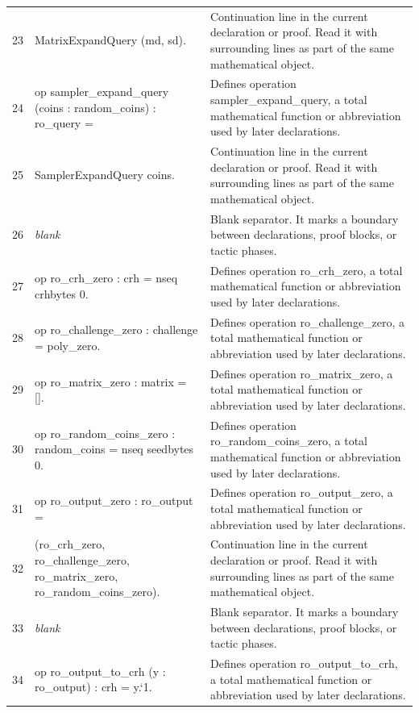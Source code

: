 \documentclass[10pt]{article}
\begin{document}
\begin{longtable}{r L{0.53\textwidth} L{0.37\textwidth}}
23 & {\ttfamily\scriptsize   MatrixExpandQuery (md, sd).} & Continuation line in the current declaration or proof.  Read it with surrounding lines as part of the same mathematical object. \\
24 & {\ttfamily\scriptsize op sampler\_expand\_query (coins : random\_coins) : ro\_query =} & Defines operation sampler\_expand\_query, a total mathematical function or abbreviation used by later declarations. \\
25 & {\ttfamily\scriptsize   SamplerExpandQuery coins.} & Continuation line in the current declaration or proof.  Read it with surrounding lines as part of the same mathematical object. \\
26 & {\ttfamily\scriptsize \emph{blank}} & Blank separator.  It marks a boundary between declarations, proof blocks, or tactic phases. \\
27 & {\ttfamily\scriptsize op ro\_crh\_zero : crh = nseq crhbytes 0.} & Defines operation ro\_crh\_zero, a total mathematical function or abbreviation used by later declarations. \\
28 & {\ttfamily\scriptsize op ro\_challenge\_zero : challenge = poly\_zero.} & Defines operation ro\_challenge\_zero, a total mathematical function or abbreviation used by later declarations. \\
29 & {\ttfamily\scriptsize op ro\_matrix\_zero : matrix = [].} & Defines operation ro\_matrix\_zero, a total mathematical function or abbreviation used by later declarations. \\
30 & {\ttfamily\scriptsize op ro\_random\_coins\_zero : random\_coins = nseq seedbytes 0.} & Defines operation ro\_random\_coins\_zero, a total mathematical function or abbreviation used by later declarations. \\
31 & {\ttfamily\scriptsize op ro\_output\_zero : ro\_output =} & Defines operation ro\_output\_zero, a total mathematical function or abbreviation used by later declarations. \\
32 & {\ttfamily\scriptsize   (ro\_crh\_zero, ro\_challenge\_zero, ro\_matrix\_zero, ro\_random\_coins\_zero).} & Continuation line in the current declaration or proof.  Read it with surrounding lines as part of the same mathematical object. \\
33 & {\ttfamily\scriptsize \emph{blank}} & Blank separator.  It marks a boundary between declarations, proof blocks, or tactic phases. \\
34 & {\ttfamily\scriptsize op ro\_output\_to\_crh (y : ro\_output) : crh = y.`1.} & Defines operation ro\_output\_to\_crh, a total mathematical function or abbreviation used by later declarations. \\

\end{longtable}
\end{document}
